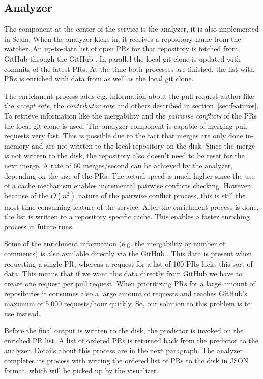 \documentclass[conference]{IEEEtran}
\begin{document}
\subsection{Analyzer}
\label{sec:analyzer}
The component at the center of the service is the analyzer, it is also implemented in Scala.
When the analyzer kicks in, it receives a repository name from the watcher.
An up-to-date list of open PRs for that repository is fetched from GitHub through the GitHub \api.
In parallel the local git clone is updated with commits of the latest PRs.
At the time both processes are finished, the list with PRs is enriched with data from \ghtorrent as well as the local git clone.

The enrichment process adds e.g. information about the pull request author like the \emph{accept rate}, the \emph{contributor rate} and others described in section~\ref{sec:features}.
To retrieve information like the mergability and the \emph{pairwise conflicts} of the PRs the local git clone is used.
The analyzer component is capable of merging pull requests very fast.
This is possible due to the fact that merges are only done in-memory and are not written to the local repository on the disk.
Since the merge is not written to the disk, the repository also doesn't need to be reset for the next merge.
A rate of 60 merges/second can be achieved by the analyzer, depending on the size of the PRs.
The actual speed is much higher since the use of a cache mechanism enables incremental pairwise conflicts checking.
However, because of the $O(n^2)$ nature of the pairwise conflict process, this is still the most time consuming feature of the service.
After the enrichment process is done, the list is written to a repository specific cache.
This enables a faster enriching process in future runs.

Some of the enrichment information (e.g. the mergability or number of comments) is also available directly via the GitHub \api.
This data is present when requesting a single PR, whereas a request for a list of 100 PRs lacks this sort of data.
This means that if we want this data directly from GitHub we have to create one \api request per pull request.
When prioritizing PRs for a large amount of repositories it consumes also a large amount of \api requests and reaches GitHub's maximum of 5,000 requests/hour quickly.
So, our solution to this problem is to use \ghtorrent instead.

Before the final output is written to the disk, the predictor is invoked on the enriched PR list.
A list of ordered PRs is returned back from the predictor to the analyzer.
Details about this process are in the next paragraph.
The analyzer completes its process with writing the ordered list of PRs to the disk in JSON format, which will be picked up by the visualizer.
\end{document}
